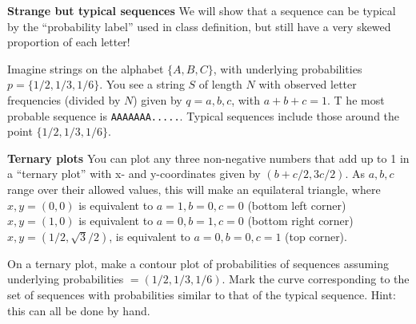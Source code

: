 \documentclass[answers]{exam}
\begin{document}
\begin{questions}
\question 

\textbf{Strange but typical sequences} We will show that a sequence can be
typical by the “probability label” used in class definition, but still have a
very skewed proportion of each letter!

Imagine strings on the alphabet $\{A,B,C\}$, with underlying probabilities
$p=\{1/2,1/3,1/6\}$. You see a string $S$ of length $N$ with observed letter
frequencies (divided by $N$) given by $q = {a, b, c}$, with $a + b + c = 1$. T
he most probable sequence is \texttt{AAAAAAA.....}.
Typical sequences include those around the point $\{1/2,1/3,1/6\}$.


\bonusquestion[10] \textbf{Ternary plots}
You can plot any three non-negative numbers that add up to 1 in a “ternary plot” with
x- and y-coordinates given by $(b + c/2, 3c/2)$. As $a, b, c$ range over their
allowed values, this will make an equilateral triangle,
where $x, y = (0,0)$ is equivalent to ${a = 1, b = 0, c = 0}$ (bottom left corner)
$x, y = (1,0)$ is equivalent to ${a = 0, b = 1, c = 0}$ (bottom right corner)
$x, y =(1/2, \sqrt{3}/2)$, is equivalent to ${a = 0, b = 0, c = 1}$ (top
corner).

On a ternary plot, make a contour plot of probabilities of sequences assuming
underlying probabilities $=(1/2,1/3,1/6)$. Mark the curve corresponding to the
set of sequences with probabilities similar to that of the typical sequence.
Hint: this can all be done by hand.

\end{questions}
\end{document}
